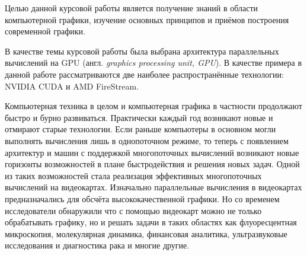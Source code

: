 
Целью данной курсовой работы является получение знаний в области компьютерной графики, изучение основных принципов и приёмов построения современной графики.

В качестве темы курсовой работы была выбрана архитектура параллельных вычислений на GPU (англ. \textit{graphics processing unit, GPU}). В качестве примера в данной работе рассматриваются две наиболее распространённые технологии: NVIDIA CUDA и AMD FireStream.

Компьютерная техника в целом и компьютерная графика в частности продолжают быстро и бурно развиваться. Практически каждый год возникают новые и отмирают старые технологии. Если раньше компьютеры в основном могли выполнять вычисления лишь в однопоточном режиме, то теперь с появлением архитектур и машин с поддержкой многопоточных вычислений возникают новые горизонты возможностей в плане быстродействия и решения новых задач. Одной из таких возможностей стала реализация эффективных многопоточных вычислений на видеокартах. Изначально параллельные вычисления в видеокартах предназначались для обсчёта высококачественной графики. Но со временем исследователи обнаружили что с помощью видеокарт можно не только обрабатывать графику, но и решать задачи в таких областях как флуоресцентная микроскопия, молекулярная динамика, финансовая аналитика, ультразвуковые исследования и диагностика рака и многие другие.


\pagebreak

